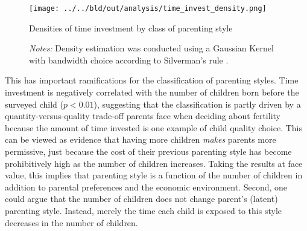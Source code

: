 \begin{figure}[htb]
	\centering
	\texttt{[image: ../../bld/out/analysis/time\_invest\_density.png]}
	\caption{Densities of time investment by class of parenting style}
	\vspace{-0.25cm}
	\caption*{\footnotesize \textit{Notes:} Density estimation was conducted using a Gaussian Kernel with bandwidth choice according to Silverman's rule \parencite{silvermanDensityEstimationStatistics1998}.}  
	\label{fig:density}  
\end{figure} 

This has important ramifications for the classification of parenting styles. Time investment is negatively correlated with the number of children born before the surveyed child ($p < 0.01$), suggesting that the classification is partly driven by a quantity-versus-quality trade-off parents face when deciding about fertility \parencite{beckerTreatiseFamily1981} because the amount of time invested is one example of child quality choice. This can be viewed as evidence that having more children \textit{makes} parents more permissive, just because the cost of their previous parenting style has become prohibitively high as the number of children increases. Taking the results at face value, this implies that parenting style is a function of the number of children in addition to parental preferences and the economic environment. Second, one could argue that the number of children does not change parent's (latent) parenting style. Instead, merely the time each child is exposed to this style decreases in the number of children.

